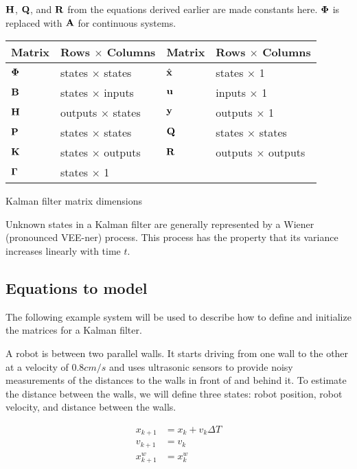 $\mathbf{H}$, $\mathbf{Q}$, and $\mathbf{R}$ from the equations derived earlier are made
constants here. $\mathbf{\Phi}$ is replaced with $\mathbf{A}$ for continuous systems.

\begin{booktable}
  \begin{tabular}{|ll|ll|}
    \hline
    \rowcolor{headingbg}
    \textbf{Matrix} & \textbf{Rows $\times$ Columns} &
    \textbf{Matrix} & \textbf{Rows $\times$ Columns} \\
    \hline
    $\mathbf{\Phi}$ & states $\times$ states & $\hat{\mathbf{x}}$ & states $\times$ 1
      \\
    $\mathbf{B}$ & states $\times$ inputs & $\mathbf{u}$ & inputs $\times$ 1 \\
    $\mathbf{H}$ & outputs $\times$ states & $\mathbf{y}$ & outputs $\times$ 1 \\
    $\mathbf{P}$ & states $\times$ states & $\mathbf{Q}$ & states $\times$ states \\
    $\mathbf{K}$ & states $\times$ outputs & $\mathbf{R}$ & outputs $\times$ outputs
      \\
    $\mathbf{\Gamma}$ & states $\times$ 1 &  &  \\
    \hline
  \end{tabular}
  \caption{Kalman filter matrix dimensions}
  \label{tab:kf_matrix_dims}
\end{booktable}

Unknown states in a Kalman filter are generally represented by a Wiener
(pronounced VEE-ner) process. This process has the property that its variance
increases linearly with time $t$.

\subsection{Equations to model}

The following example system will be used to describe how to define and
initialize the matrices for a Kalman filter.

A robot is between two parallel walls. It starts driving from one wall to the
other at a velocity of $0.8 cm/s$ and uses ultrasonic sensors to provide noisy
measurements of the distances to the walls in front of and behind it. To
estimate the distance between the walls, we will define three states: robot
position, robot velocity, and distance between the walls.

\begin{align}
  x_{k+1} &= x_k + v_k \Delta T \\
  v_{k+1} &= v_k \\
  x_{k+1}^w &= x_k^w
\end{align}

